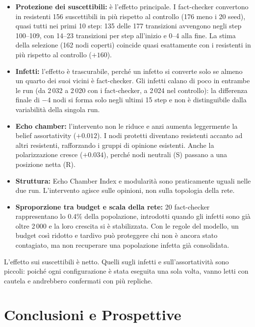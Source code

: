 \documentclass[11pt, a4paper]{article}
\begin{document}
\begin{itemize}[leftmargin=*]
    \item \textbf{Protezione dei suscettibili:} è l'effetto principale. I fact-checker convertono in resistenti 156 suscettibili in più rispetto al controllo (176 meno i 20 seed), quasi tutti nei primi 10 step: 135 delle 177 transizioni avvengono negli step 100--109, con 14--23 transizioni per step all'inizio e 0--4 alla fine. La stima della selezione (162 nodi coperti) coincide quasi esattamente con i resistenti in più rispetto al controllo ($+160$).
    \item \textbf{Infetti:} l'effetto è trascurabile, perché un infetto si converte solo se almeno un quarto dei suoi vicini è fact-checker. Gli infetti calano di poco in entrambe le run (da 2\,032 a 2\,020 con i fact-checker, a 2\,024 nel controllo): la differenza finale di $-4$ nodi si forma solo negli ultimi 15 step e non è distinguibile dalla variabilità della singola run.
    \item \textbf{Echo chamber:} l'intervento non le riduce e anzi aumenta leggermente la belief assortativity ($+0.012$). I nodi protetti diventano resistenti accanto ad altri resistenti, rafforzando i gruppi di opinione esistenti. Anche la polarizzazione cresce ($+0.034$), perché nodi neutrali (S) passano a una posizione netta (R).
    \item \textbf{Struttura:} Echo Chamber Index e modularità sono praticamente uguali nelle due run. L'intervento agisce sulle opinioni, non sulla topologia della rete.
    \item \textbf{Sproporzione tra budget e scala della rete:} 20 fact-checker rappresentano lo 0.4\% della popolazione, introdotti quando gli infetti sono già oltre 2\,000 e la loro crescita si è stabilizzata. Con le regole del modello, un budget così ridotto e tardivo può proteggere chi non è ancora stato contagiato, ma non recuperare una popolazione infetta già consolidata.
\end{itemize}

L'effetto sui suscettibili è netto. Quelli sugli infetti e sull'assortatività sono piccoli: poiché ogni configurazione è stata eseguita una sola volta, vanno letti con cautela e andrebbero confermati con più repliche.

\section{Conclusioni e Prospettive}
\end{document}
